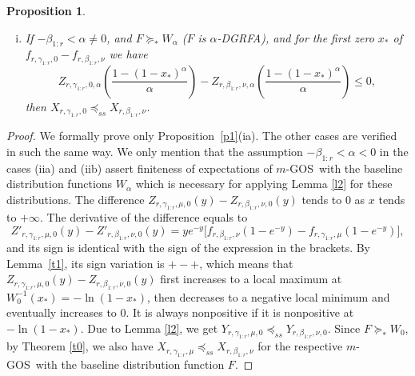 \documentclass [11pt]{article}
\newtheorem{proposition}{Proposition}
\newcommand{\gos}{GOS}
\begin{document}
\begin{proposition}
\begin{enumerate}[(a)]
\begin{enumerate}[(i)]
    \item
    If $-\beta_{1:r} <\alpha\neq 0$, and $F \succeq_* W_\alpha$ ($F$ is $\alpha$-DGRFA), and for the first zero $x_*$ of $f_{r, \gamma_{1:r}, 0} - f_{r,\beta_{1:r}, \nu}$ we have
    \begin{equation*}
    \label{25i}
    Z_{r, \gamma_{1:r}, 0, \alpha}\left(\frac{1-(1-x_*)^\alpha}{\alpha}
    \right) -
    Z_{r, \beta_{1:r}, \nu, \alpha}\left(\frac{1-(1-x_*)^\alpha}{\alpha}
    \right)  \leq 0,
    \end{equation*}
    then $X_{r,\gamma_{1:r}, 0} \preceq_{ss} X_{r, \beta_{1:r},\nu}$.
    \end{enumerate}
\end{enumerate}
\end{proposition}

\begin{proof}
We formally prove only Proposition~\ref{p1}(ia). The other cases are verified in such the same way. 
We only mention that the assumption $-\beta_{1:r}<
\alpha <0$ in the cases (iia) and (iib) assert finiteness of expectations of $m$-\gos\ with the baseline distribution functions 
$W_\alpha$ which is necessary for applying Lemma \ref{l2} for these 
distributions.
The difference $Z_{r, \gamma_{1:r}, \mu, 0}(y) -
Z_{r, \beta_{1:r}, \nu, 0}(y)$ tends to $0$ as $x$ tends to $+\infty$. The derivative of the difference equals to
\begin{equation*}
\label{25k}
Z'_{r, \gamma_{1:r}, \mu, 0}(y) -
Z'_{r, \beta_{1:r}, \nu, 0}(y) = y e^{-y} \bigl[
f_{r, \beta_{1:r},\nu}(1-e^{-y}) - f_{r, \gamma_{1:r}, \mu}(1-e^{-y})\bigr],
\end{equation*}
and its sign is identical with the sign of the expression
in the brackets.
By Lemma~\ref{t1}, its sign variation is $+-+$, which means that $Z_{r, \gamma_{1:r}, \mu, 0}(y) - Z_{r, \beta_{1:r}, \nu, 0}(y)$
first increases to a local maximum at $W^{-1}_0(x_*)= -\ln (1-x_*)$, then decreases to a negative local minimum and eventually increases to $0$.
It is always nonpositive if it is nonpositive at $-\ln (1-x_*)$. Due to Lemma \ref{l2}, we get $Y_{r,\gamma_{1:r}, \mu,0}\preceq_{ss} Y_{r,\beta_{1:r}, \nu, 0}$.
Since $F \succeq_* W_0$, by Theorem \ref{t0}, we also have $X_{r,\gamma_{1:r}, \mu}\preceq_{ss} X_{r,\beta_{1:r}, \nu}$
for the respective $m$-\gos\ with the baseline distribution function $F$.
\end{proof} %

\end{document}

